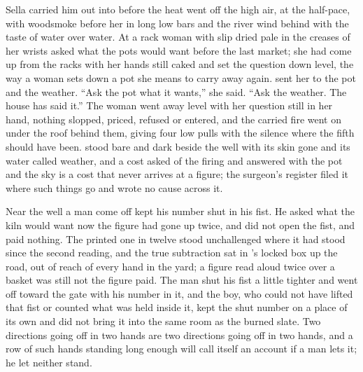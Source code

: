 \scenebreak

Sella carried him out into  before the heat went off the high air, at the half-pace, with woodsmoke before her in long low bars and the river wind behind with the taste of water over water. At  a rack woman with slip dried pale in the creases of her wrists asked what the pots would want before the last market; she had come up from the racks with her hands still caked and set the question down level, the way a woman sets down a pot she means to carry away again.  sent her to the pot and the weather. “Ask the pot what it wants,” she said. “Ask the weather. The house has said it.” The woman went away level with her question still in her hand, nothing slopped, priced, refused or entered, and the carried fire went on under the roof behind them, giving four low pulls with the silence where the fifth should have been.  stood bare and dark beside the well with its skin gone and its water called weather, and a cost asked of the firing and answered with the pot and the sky is a cost that never arrives at a figure; the surgeon's register filed it where such things go and wrote no cause across it.

Near the well a man come off  kept his number shut in his fist. He asked what the kiln would want now the figure had gone up twice, and did not open the fist, and paid nothing. The printed one in twelve stood unchallenged where it had stood since the second reading, and the true subtraction sat in 's locked box up the road, out of reach of every hand in the yard; a figure read aloud twice over a basket was still not the figure paid. The man shut his fist a little tighter and went off toward the gate with his number in it, and the boy, who could not have lifted that fist or counted what was held inside it, kept the shut number on a place of its own and did not bring it into the same room as the burned slate. Two directions going off in two hands are two directions going off in two hands, and a row of such hands standing long enough will call itself an account if a man lets it; he let neither stand.

